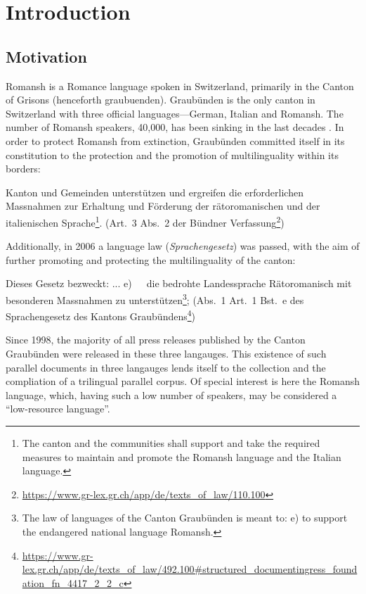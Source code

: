 \chapter{Introduction}
\section{Motivation}
Romansh is a Romance language spoken in Switzerland, primarily in the Canton of Grisons (henceforth \gls{graubuenden}). 
Graubünden is the only canton in Switzerland with three official languages---German, Italian and Romansh. 
The number of Romansh speakers, 40,000, has been sinking in the last decades \autocite{bundesamt2020}. 
In order to protect Romansh from extinction, Graubünden committed itself in its constitution to the protection and the promotion of multilinguality within its borders: 

\begin{displayquote}
Kanton und Gemeinden unterstützen und ergreifen die erforderlichen Massnahmen zur Erhaltung und Förderung der rätoromanischen und der italienischen Sprache\footnote{The canton and the communities shall support and take the required measures to maintain and promote the Romansh language and the Italian language.}. 
(Art.~3 Abs.~2 der Bündner Verfassung\footnote{\url{https://www.gr-lex.gr.ch/app/de/texts_of_law/110.100}}) 
\end{displayquote}

Additionally, in 2006 a language law (\emph{Sprachengesetz}) was passed, with the aim of further promoting and protecting the multilinguality of the canton:
\begin{displayquote}
Dieses Gesetz bezweckt:
...
e)~~~die  bedrohte  Landessprache  Rätoromanisch  mit  besonderen  Massnahmen zu unterstützen\footnote{The law of languages of the Canton Graubünden is meant to: e) to support the endangered national language Romansh.}; (Abs.~1 Art.~1 Bst.~e des Sprachengesetz des Kantons Graubündens\footnote{\url{https://www.gr-lex.gr.ch/app/de/texts_of_law/492.100\#structured_documentingress_foundation_fn_4417_2_2_c}})
\end{displayquote}


Since 1998, the majority of all press releases published by the Canton Graubünden were released in these three langauges. 
This existence of such parallel documents in three langauges lends itself to the collection and the compliation of a trilingual parallel corpus. 
Of special interest is here the Romansh language, which, having such a low number of speakers, may be considered a  \enquote{low-resource language}.


